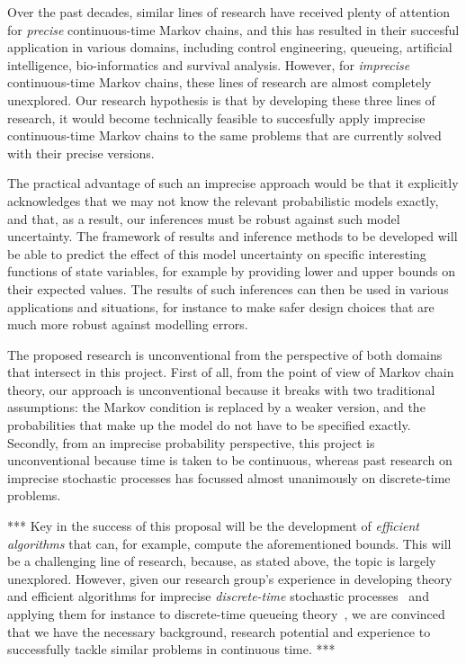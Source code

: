 \documentclass[11pt,dvipsnames,usenames,a4paper]{article}
\begin{document}
Over the past decades, similar lines of research have received plenty of attention for \emph{precise} continuous-time Markov chains, and this has resulted in their succesful application in various domains, including control engineering, queueing, artificial intelligence, bio-informatics and survival analysis.
However, for \emph{imprecise} continuous-time Markov chains, these lines of research are almost completely unexplored.
Our research hypothesis is that by developing these three lines of research, it would become technically feasible to succesfully apply imprecise continuous-time Markov chains to the same problems that are currently solved with their precise versions.

The practical advantage of such an imprecise approach would be that it explicitly acknowledges that we may not know the relevant probabilistic models exactly, and that, as a result, our inferences must be robust against such model uncertainty. 
The framework of results and inference methods to be developed will be able to predict the effect of this model uncertainty on specific interesting functions of state variables, for example by providing lower and upper bounds on their expected values. 
The results of such inferences can then be used in various applications and situations, for instance to make safer design choices that are much more robust against modelling errors.


The proposed research is unconventional from the perspective of both domains that intersect in this project.
First of all, from the point of view of Markov chain theory, our approach is unconventional because it breaks with two traditional assumptions: the Markov condition is replaced by a weaker version, and the probabilities that make up the model do not have to be specified exactly. Secondly, from an imprecise probability perspective, this project is unconventional because time is taken to be continuous, whereas past research on imprecise stochastic processes has focussed almost unanimously on discrete-time problems.


*** Key in the success of this proposal will be the development of \emph{efficient algorithms} that can, for example, compute the aforementioned bounds. 
This will be a challenging line of research, because, as stated above, the topic is largely unexplored. 
However, given our research group's experience in developing theory and efficient algorithms for imprecise \emph{discrete-time} stochastic processes~\cite{cooman2007d,cooman2008,hermans2012,cooman2015:markovergodic,cooman2015:isipta:markov} and applying them for instance to discrete-time queueing theory~\cite{lopatatzidis2015:queueing:initial}, we are convinced that we have the necessary background, research potential and experience to successfully tackle similar problems in continuous time. ***
\end{document}
